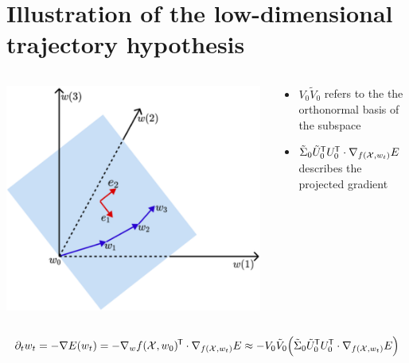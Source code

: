 \documentclass[t]{beamer}
\newcommand{\X}{\mathcal{X}}
\renewcommand*{\tr}{^{\mkern-1.5mu\mathsf{T}}}
\begin{document}
\section{Illustration of the low-dimensional trajectory hypothesis}
\begin{frame}
\begin{columns}[c]

\begin{column}{0.5\textwidth}
\begin{center}
\includegraphics[width=0.99\textwidth]{approach.png}
\end{center}
\end{column}

\begin{column}{0.5\textwidth}
\begin{itemize}
\item $ V_0 \tilde{V}_0$ refers to the the orthonormal basis of the subspace \vspace{0.5cm}
\item $\tilde{\Sigma}_0 \tilde{U}_0\tr  U_0\tr  \cdot \nabla_{f(\X,w_t)} E$ describes the projected gradient 
\end{itemize}
\end{column}
\end{columns}
\vspace{0.5cm}
\[ \partial_t w_t = -\nabla E(w_t) = -\nabla_wf(\X,w_0)\tr  \cdot \nabla_{f(\X,w_t)} E \approx - V_0 \tilde{V}_0 \Big ( \tilde{\Sigma}_0 \tilde{U}_0\tr  U_0\tr  \cdot \nabla_{f(\X,w_t)} E \Big ) \]
\end{frame}
\end{document}
